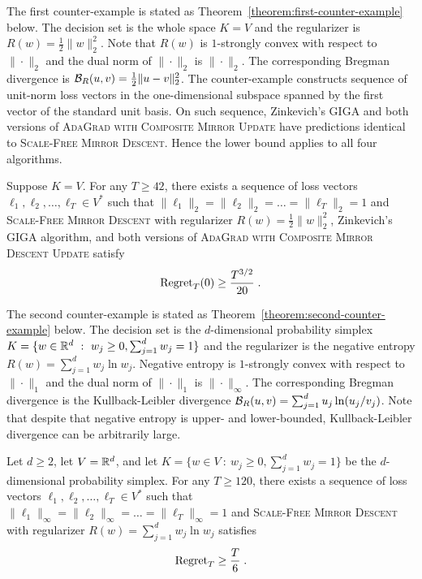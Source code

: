 The first counter-example is stated as
Theorem~\ref{theorem:first-counter-example} below. The decision set is the
whole space $K=V$ and the regularizer is $R(w) = \frac{1}{2}\|w\|_2^2$. Note
that $R(w)$ is $1$-strongly convex with respect to $\|\cdot\|_2$ and the dual
norm of $\|\cdot\|_2$ is $\|\cdot\|_2$. The corresponding Bregman divergence is
$\mathcal{B}_R(u,v) = \frac{1}{2}\|u-v\|_2^2$. The counter-example constructs
sequence of unit-norm loss vectors in the one-dimensional subspace spanned by
the first vector of the standard unit basis.  On such sequence, Zinkevich's
\textsc{GIGA} and both versions of \textsc{AdaGrad with Composite Mirror
Update} have predictions identical to \textsc{Scale-Free Mirror Descent}. Hence
the lower bound applies to all four algorithms.

\begin{theorem}
\label{theorem:first-counter-example}
Suppose $K = V$. For any $T \ge 42$, there exists a sequence of loss vectors
$\ell_1, \ell_2, \dots, \ell_T \in V^*$ such that $\|\ell_1\|_2 = \|\ell_2\|_2
= \dots = \|\ell_T\|_2 = 1$ and \textsc{Scale-Free Mirror Descent} with
regularizer $R(w) = \frac{1}{2}\|w\|_2^2$, Zinkevich's \textsc{GIGA} algorithm,
and both versions of \textsc{AdaGrad with Composite Mirror Descent Update}
satisfy
$$
\operatorname{Regret}_T(0) \ge \frac{T^{3/2}}{20} \; .
$$
\end{theorem}

The second counter-example is stated as
Theorem~\ref{theorem:second-counter-example} below.  The decision set is the
$d$-dimensional probability simplex $K = \{ w \in \mathbb{R}^d ~:~ w_j \ge 0,
\sum_{j=1}^d w_j = 1 \}$ and the regularizer is the negative entropy $R(w) =
\sum_{j=1}^d w_j \ln w_j$.  Negative entropy is $1$-strongly convex with
respect to $\|\cdot\|_1$ and the dual norm of $\|\cdot\|_1$ is
\mbox{$\|\cdot\|_\infty$}.  The corresponding Bregman divergence is the
Kullback-Leibler divergence $\mathcal{B}_R(u,v) = \sum_{j=1}^d u_j \ln(u_j/v_j)$.
Note that despite that negative entropy is upper- and lower-bounded,
Kullback-Leibler divergence can be arbitrarily large.

\begin{theorem}
\label{theorem:second-counter-example}
Let $d \ge 2$, let $V = \mathbb{R}^d$, and let $K = \{ w \in V ~:~ w_j \ge 0,
\sum_{j=1}^d w_j = 1 \}$ be the $d$-dimensional probability simplex.  For any
$T \ge 120$, there exists a sequence of loss vectors $\ell_1, \ell_2, \dots,
\ell_T \in V^*$ such that $\|\ell_1\|_\infty = \|\ell_2\|_\infty = \dots =
\|\ell_T\|_\infty = 1$ and \textsc{Scale-Free Mirror Descent} with regularizer
$R(w) = \sum_{j=1}^d w_j \ln w_j$ satisfies
$$
\operatorname{Regret}_T \ge \frac{T}{6} \; .
$$
\end{theorem}
